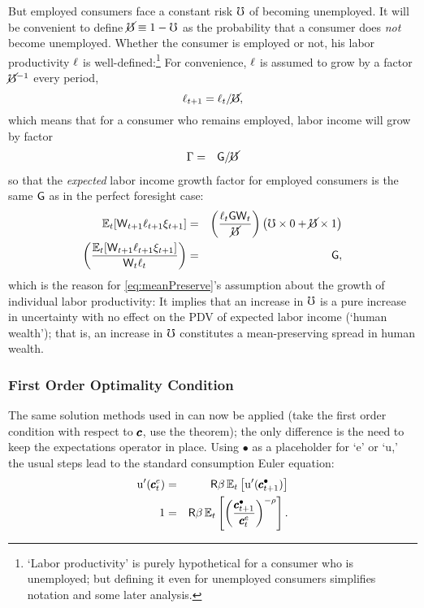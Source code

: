 \documentclass{handout}
\begin{document}
But employed consumers face a constant risk $\mho$ of becoming unemployed.  
It will be convenient to define $\cancel{\mho}\equiv 1-\mho$ as the probability that a consumer does {\it not} become unemployed.  Whether the consumer is employed or not, his labor productivity $\ell$ is well-defined:\footnote{`Labor productivity' is purely hypothetical for a consumer who is unemployed; but defining it even for unemployed consumers simplifies notation and some later analysis.}  For convenience, $\ell$ is assumed to grow by a factor $\cancel{\mho}^{-1}$ every period,
\begin{equation}
\ell_{t+1} =    \ell_{t}/\cancel{\mho} \label{eq:meanPreserve},
\end{equation}
which means that for a consumer who remains employed, labor income will grow by factor
\begin{eqnarray}
  \Gamma & = & \mathsf{G}/\cancel{\mho}
\end{eqnarray}
so that the {\it expected} labor income growth factor for
employed consumers is the same $\mathsf{G}$ as in the perfect foresight case:
\begin{eqnarray*}
  \operatorname{\mathbb{E}}_{t}[\mathsf{W}_{t+1}\ell_{t+1}\xi_{t+1}] & = &  \left(\frac{\ell_{t} \mathsf{G} \mathsf{W}_{t}}{\cancel{\mho}}\right)\left(\mho \times 0 + \cancel{\mho} \times 1 \right)
\\ \left(\frac{\operatorname{\mathbb{E}}_{t}[\mathsf{W}_{t+1}\ell_{t+1}\xi_{t+1}]}{\mathsf{W}_{t} \ell_{t}}\right) &  = & \mathsf{G}
,
\end{eqnarray*}
which is  the reason for \eqref{eq:meanPreserve}'s assumption about the growth of
individual labor productivity: It implies
that an increase in $\mho$ is a pure increase in uncertainty with no
effect on the PDV of expected labor income (`human wealth'); that is, an increase in $\mho$ constitutes a mean-preserving spread in human wealth.

\subsubsection{First Order Optimality Condition}

The same solution methods used in  can now
be applied (take the first order condition with respect to $\pmb{c}$, use
the  theorem); the only difference is the need to keep the expectations operator
in place.  Using $\bullet$ as a placeholder for `e' or `u,' the
usual steps lead to the standard consumption Euler equation:
\begin{eqnarray}
        {\ensuremath{\mathrm{u}}}^{\prime}(\pmb{c}^{e}_{t}) & = & \mathsf{R}\beta \operatorname{\mathbb{E}}_{t}\left[{\mathrm{u}}^{\prime}(\pmb{c}^{\bullet}_{t+1}) \right]
\\  1         & = & \mathsf{R}\beta \operatorname{\mathbb{E}}_{t}\left[\left(\frac{\pmb{c}^{\bullet}_{t+1}}{\pmb{c}^{e}_{t}}\right)^{-\rho} \right]
.
\end{eqnarray}
\end{document}
